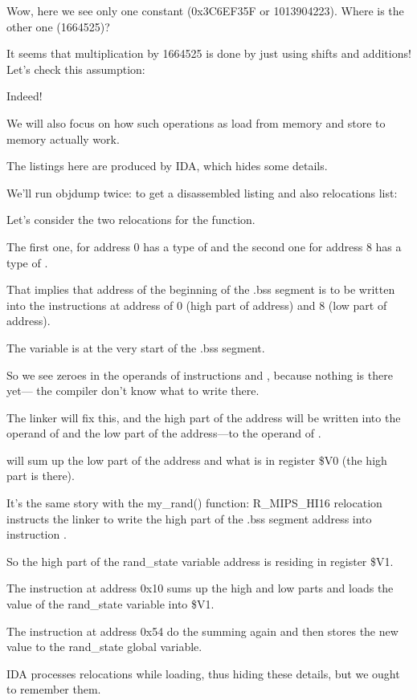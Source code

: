 


Wow, here we see only one constant (0x3C6EF35F or 1013904223).
Where is the other one (1664525)?

It seems that multiplication by 1664525 is done by just using shifts and additions!
Let's check this assumption:





Indeed!


We will also focus on how such operations as load from memory and store to memory actually work.

The listings here are produced by IDA, which hides some details.

We'll run objdump twice: to get a disassembled listing and also relocations list:



Let's consider the two relocations for the  function.

The first one, for address 0 has a type of 
and the second one for address 8 has a type of .

That implies that address of the beginning of the .bss segment is to be written into the instructions at
address of 0 (high part of address) and 8 (low part of address).

The  variable is at the very start of the .bss segment.

So we see zeroes in the operands of instructions \LUI and \SW, because nothing is there yet---
the compiler don't know what to write there.

The linker will fix this, and the high part of the address will be written into the operand of \LUI and
the low part of the address---to the operand of \SW.

\SW will sum up the low part of the address and what is in register \$V0 (the high part is there).

It's the same story with the my\_rand() function: R\_MIPS\_HI16 relocation instructs the linker to write the high part
of the .bss segment address into instruction \LUI.

So the high part of the rand\_state variable address is residing in register \$V1.

The \LW instruction at address 0x10 sums up the high and low parts and loads the value of the rand\_state 
variable into \$V1.

The \SW instruction at address 0x54 do the summing again and then stores the new value 
to the rand\_state global variable.

IDA processes relocations while loading, thus hiding these details,
but we ought to remember them.

